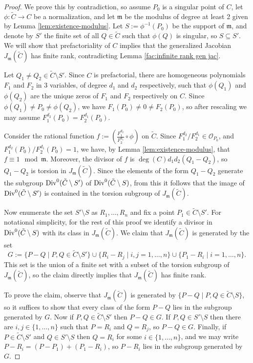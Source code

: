 \documentclass{amsart}
\theoremstyle{plain}
\theoremstyle{definition}
\newcommand{\Div}{\textnormal{Div}}
\begin{document}
\begin{proof}
	We prove this by contradiction, so assume $P_0$ is a singular point of $C$, let $\phi:\tilde{C} \rightarrow C$ be a normalization, and let $\mathfrak{m}$ be the modulus of degree at least 2 given by Lemma \ref{lem:existence-modulus}. Let $S:=\phi^{-1}(P_0)$ be the support of $\mathfrak m$, and denote by $S'$ the finite set of all $Q \in \tilde{C}$ such that $\phi(Q)$ is singular, so $S \subseteq S'$. We will show that prefactoriality of $C$ implies that the generalized Jacobian $J_{\mathfrak{m}}(\tilde{C})$ has finite rank, contradicting Lemma \ref{fac:infinite rank gen jac}.
	
	Let $Q_1 \neq Q_2 \in \tilde{C} \setminus S'$. Since $C$ is prefactorial, there are homogeneous polynomials $F_1$ and $F_2$ in $3$ variables, of degree $d_1$ and $d_2$ respectively, such that $\phi(Q_1)$ and $\phi(Q_2)$ are the unique zeros of $F_1$ and $F_2$ respectively on $C$. Since $\phi(Q_1) \neq P_0 \neq \phi(Q_2)$, we have $F_1(P_0) \neq 0 \neq F_2(P_0)$, so after rescaling we may assume $F_1^{d_2}(P_0)=F_2^{d_1}(P_0)$.
	
	Consider the rational function $f:=\left(\frac{F_1^{d_2}}{F_2^{d_1}} \circ \phi\right) $ on $\tilde{C}$. Since $F_1^{d_2}/F_2^{d_1} \in \mathcal{O}_{P_0}$, and $F_1^{d_2}(P_0)/F_2^{d_1}(P_0)=1$, we have, by Lemma \ref{lem:existence-modulus}, that $f \equiv 1 \mod \mathfrak{m}$. Moreover, the divisor of $f$ is $\deg(C)d_1d_2 (Q_1-Q_2)$, so $Q_1-Q_2$ is torsion in $J_\mathfrak{m}(\tilde{C})$. Since the elements of the form $Q_1-Q_2$ generate the subgroup $\Div^0(\tilde{C} \setminus S')$ of $\Div^0(\tilde{C} \setminus S)$, from this it follows that the image of $\Div^0(\tilde{C} \setminus S')$ is contained in the torsion subgroup of $J_{\mathfrak{m}}(\tilde{C})$.
	
	Now enumerate the set $S' \setminus S$ as $R_1,\dots,R_n$ and fix a point $P_1 \in \tilde C \setminus S'$. For notational simplicity, for the rest of this proof we identify a divisor in $\Div^0(\tilde{C} \setminus S)$ with its class in $J_{\mathfrak{m}}(\tilde{C})$. We claim that $J_{\mathfrak{m}}(\tilde{C})$ is generated by the set \[ G:=\{P-Q \mid P,Q \in \tilde{C} \setminus S'\} \cup \{R_i-R_j \mid i,j=1,\dots,n \} \cup \{P_1-R_i \mid i=1,\dots,n\}. \] This set is the union of a finite set with a subset of the torsion subgroup of $J_{\mathfrak{m}}(\tilde{C})$, so the claim directly implies that $J_{\mathfrak{m}}(\tilde{C})$ has finite rank.

    To prove the claim, observe that $J_{\mathfrak{m}}(\tilde C)$ is generated by $\{P-Q \mid P,Q \in \tilde{C} \setminus S \}$, so it suffices to show that every class of the form $P-Q$ lies in the subgroup generated by $G$. Now if $P,Q \in \tilde{C} \setminus S'$ then $P-Q \in G$. If $P,Q \in S' \setminus S$ then there are $i,j \in \{1,\dots,n\}$ such that $P=R_i$ and $Q=R_j$, so $P-Q \in G$. Finally, if $P \in \tilde{C} \setminus S'$ and $Q \in S' \setminus S$ then $Q=R_i$ for some $i \in \{1,\dots,n\}$, and we may write $P-R_i=(P-P_1) + (P_1 -R_i)$, so $P-R_i$ lies in the subgroup generated by $G$.
\end{proof}
\end{document}
